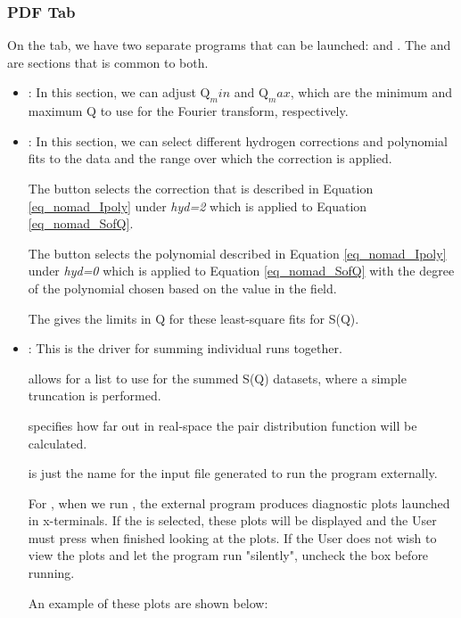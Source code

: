 \subsubsection{PDF Tab}

On the  tab, we have two separate programs that can be launched:  and . The   and  are sections that is common to both.

\begin{itemize}

\item {}: In this section, we can adjust $\text{Q}_min$ and $\text{Q}_max$, which are the minimum and maximum Q to use for the Fourier transform, respectively.

\item {}: In this section, we can select different hydrogen corrections and polynomial fits to the data and the range over which the correction is applied. 

The  button selects the correction that is described in Equation \ref{eq_nomad_Ipoly} under \textit{hyd=2} which is applied to Equation \ref{eq_nomad_SofQ}. 

The  button selects the polynomial described in Equation \ref{eq_nomad_Ipoly} under \textit{hyd=0} which is applied to Equation \ref{eq_nomad_SofQ} with the degree of the polynomial chosen based on the value in the  field. 

The  gives the limits in Q for these least-square fits for S(Q).

\item {}: This is the driver for summing individual runs together. 

 allows for a list to use for the summed S(Q) datasets, where a simple truncation is performed. 

 specifies how far out in real-space the pair distribution function will be calculated. 

 is just the name for the input file generated to run the  program externally.  

For , when we run , the external program produces diagnostic plots launched in x-terminals. If the  is selected, these plots will be displayed and the User must press  when finished looking at the plots. If the User does not wish to view the plots and let the program run "silently", uncheck the box before running. 

An example of these plots are shown below:

\end{itemize}

